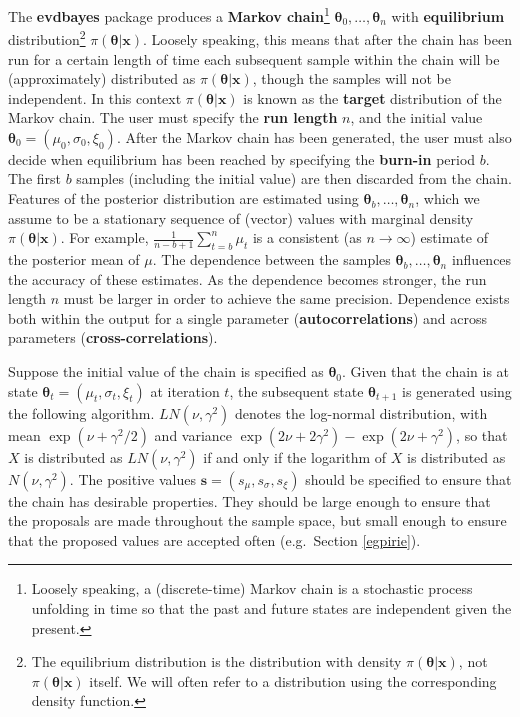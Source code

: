 \documentclass[11pt,a4paper]{article}
\newcommand{\bs}{\boldsymbol}
\begin{document}
The \textbf{evdbayes} package produces a \textbf{Markov
  chain}\footnote{Loosely speaking, a (discrete-time) Markov chain is
  a stochastic process unfolding in time so that the past and future
  states are independent given the present.}
$\bs{\theta}_0,\dots,\bs{\theta}_n$ with \textbf{equilibrium}
distribution\footnote{The equilibrium distribution is the distribution
  with density $\pi(\bs{\theta}|\bs{x})$, not
  $\pi(\bs{\theta}|\bs{x})$ itself. We will often refer to a
  distribution using the corresponding density function.}
$\pi(\bs{\theta}|\bs{x})$.  Loosely speaking, this means that after
the chain has been run for a certain length of time each subsequent
sample within the chain will be (approximately) distributed as
$\pi(\bs{\theta}|\bs{x})$, though the samples will not be independent.
In this context $\pi(\bs{\theta}|\bs{x})$ is known as the
\textbf{target} distribution of the Markov chain.  The user must
specify the \textbf{run length} $n$, and the initial value
$\bs{\theta}_0 = (\mu_0,\sigma_0,\xi_0)$.  After the Markov chain has
been generated, the user must also decide when equilibrium has been
reached by specifying the \textbf{burn-in} period $b$.  The first $b$
samples (including the initial value) are then discarded from the
chain.  Features of the posterior distribution are estimated using
$\bs{\theta}_b,\dots,\bs{\theta}_n$, which we assume to be a
stationary sequence of (vector) values with marginal density
$\pi(\bs{\theta}|\bs{x})$.  For example, $\frac{1}{n-b+1}\sum_{t=b}^n
\mu_t$ is a consistent (as $n \rightarrow \infty$) estimate of the
posterior mean of $\mu$.  The dependence between the samples
$\bs{\theta}_b,\dots,\bs{\theta}_n$ influences the accuracy of these
estimates.  As the dependence becomes stronger, the run length $n$
must be larger in order to achieve the same precision.  Dependence
exists both within the output for a single parameter
(\textbf{autocorrelations}) and across parameters
(\textbf{cross-correlations}).

Suppose the initial value of the chain is specified as
$\bs{\theta}_0$.  Given that the chain is at state $\bs{\theta}_t =
(\mu_t,\sigma_t,\xi_t)$ at iteration $t$, the subsequent state
$\bs{\theta}_{t+1}$ is generated using the following algorithm.
$LN(\nu, \gamma^2)$ denotes the log-normal distribution, with mean
$\exp(\nu + \gamma^2/2)$ and variance $\exp(2\nu + 2\gamma^2) -
\exp(2\nu + \gamma^2)$, so that $X$ is distributed as $LN(\nu,
\gamma^2)$ if and only if the logarithm of $X$ is distributed as
$N(\nu, \gamma^2)$.  The positive values $\bs{s} =
(s_\mu,s_\sigma,s_\xi)$ should be specified to ensure that the chain
has desirable properties.  They should be large enough to ensure that
the proposals are made throughout the sample space, but small enough
to ensure that the proposed values are accepted often (e.g.\ Section
\ref{egpirie}).
\end{document}
